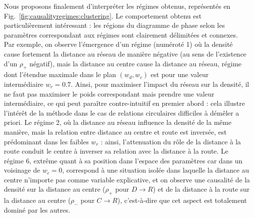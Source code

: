 {Nous proposons finalement d'interpréter les régimes obtenus, représentés en Fig.~\ref{fig:causalityregimes:clustering}. Le comportement obtenu est particulièrement intéressant : les régions du diagramme de phase selon les paramètres correspondant aux régimes sont clairement délimitées et connexes. Par exemple, on observe l'émergence d'un régime (numéroté 1) où la densité cause fortement la distance au réseau de manière négative (au sens de l'existence d'un $\rho_+$ négatif), mais la distance au centre cause la distance au réseau, régime dont l'étendue maximale dans le plan $(w_d,w_c)$ est pour une valeur intermédiaire $w_r=0.7$. Ainsi, pour maximiser l'impact du réseau sur la densité, il ne faut pas maximiser le poids correspondant mais prendre une valeur intermédiaire, ce qui peut paraître contre-intuitif en premier abord : cela illustre l'intérêt de la méthode dans le cas de relations circulaires difficiles à démêler a priori. Le régime 2, où la distance au réseau influence la densité de la même manière, mais la relation entre distance au centre et route est inversée, est prédominant dans les faibles $w_r$ : ainsi, l'attenuation du rôle de la distance à la route conduit le centre à inverser sa relation avec la distance à la route. Le régime 6, extrême quant à sa position dans l'espace des paramètres car dans un voisinage de $w_c = 0$, correspond à une situation isolée dans laquelle la distance au centre n'importe pas comme variable explicative, et on observe une causalité de la densité sur la distance au centre ($\rho_+$ pour $D\rightarrow R$) et de la distance à la route sur la distance au centre ($\rho_-$ pour $C\rightarrow R$), c'est-à-dire que cet aspect est totalement dominé par les autres.
}













